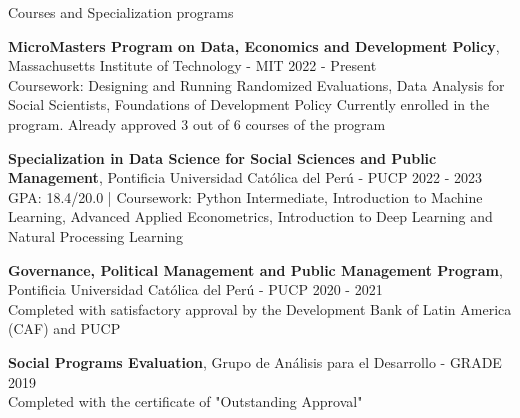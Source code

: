\documentclass{resume} %
\begin{document}
\begin{rSection}{Courses and Specialization programs}

{\bf MicroMasters Program on Data, Economics and Development Policy}, Massachusetts Institute of Technology - MIT \hfill {2022 - Present}\\
Coursework: Designing and Running Randomized Evaluations, Data Analysis for Social Scientists, Foundations of Development Policy
Currently enrolled in the program. Already approved 3 out of 6 courses of the program

{\bf Specialization in Data Science for Social Sciences and Public Management}, Pontificia Universidad Católica del Perú - PUCP \hfill {2022 - 2023}\\
GPA: 18.4/20.0 | Coursework: Python Intermediate, Introduction to Machine Learning, Advanced Applied Econometrics, Introduction to Deep Learning and Natural Processing Learning

{\bf Governance, Political Management and Public Management Program}, Pontificia Universidad Católica del Perú - PUCP \hfill {2020 - 2021}\\
Completed with satisfactory approval by the Development Bank of Latin America (CAF) and PUCP

{\bf Social Programs Evaluation}, Grupo de Análisis para el Desarrollo - GRADE \hfill {2019}\\
Completed with the certificate of "Outstanding Approval"
\end{rSection}
\end{document}

